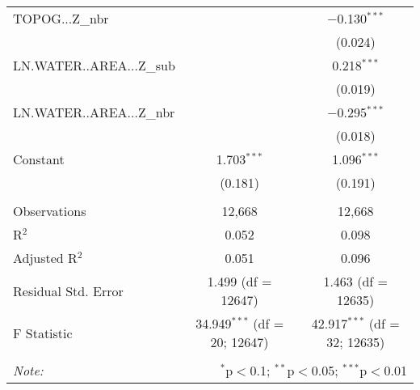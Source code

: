 \begin{table}[!htbp]
\begin{tabular}{@{\extracolsep{5pt}}lcc}
  TOPOG...Z\_nbr &  & $-$0.130$^{***}$ \\ 
  &  & (0.024) \\ 
  LN.WATER..AREA...Z\_sub &  & 0.218$^{***}$ \\ 
  &  & (0.019) \\ 
  LN.WATER..AREA...Z\_nbr &  & $-$0.295$^{***}$ \\ 
  &  & (0.018) \\ 
  Constant & 1.703$^{***}$ & 1.096$^{***}$ \\ 
  & (0.181) & (0.191) \\ 
 \hline \\[-1.8ex] 
Observations & 12,668 & 12,668 \\ 
R$^{2}$ & 0.052 & 0.098 \\ 
Adjusted R$^{2}$ & 0.051 & 0.096 \\ 
Residual Std. Error & 1.499 (df = 12647) & 1.463 (df = 12635) \\ 
F Statistic & 34.949$^{***}$ (df = 20; 12647) & 42.917$^{***}$ (df = 32; 12635) \\ 
\hline 
\hline \\[-1.8ex] 
\textit{Note:}  & \multicolumn{2}{r}{$^{*}$p$<$0.1; $^{**}$p$<$0.05; $^{***}$p$<$0.01} \\ 
\end{tabular} 
\end{table} 
